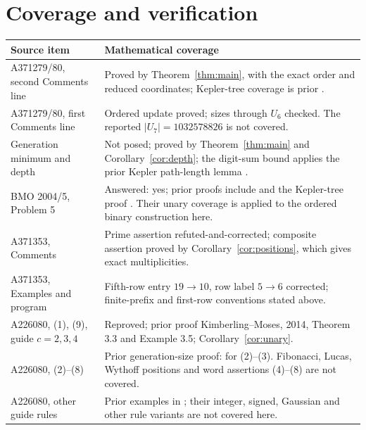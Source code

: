 \documentclass[11pt]{article}
\begin{document}
\section{Coverage and verification}
\begin{center}
\small
\begin{tabular}{@{}p{.25\linewidth}p{.67\linewidth}@{}}
\toprule
Source item & Mathematical coverage \\
\midrule
A371279/80, second Comments line & Proved by Theorem~\ref{thm:main},
with the exact order and reduced coordinates; Kepler-tree coverage is prior
\cite{smolinsky,dekking}. \\
A371279/80, first Comments line & Ordered update proved; sizes through
$U_6$ checked. The reported $|U_7|=1032578826$ is not covered. \\
Generation minimum and depth & Not posed; proved by Theorem~\ref{thm:main}
and Corollary~\ref{cor:depth}; the digit-sum bound applies the prior
Kepler path-length lemma \cite{minkowski}. \\
BMO 2004/5, Problem 5 & Answered: yes; prior proofs include
\cite[Solution 14]{saha} and the Kepler-tree proof \cite[Theorem 6.2]{recent}.
Their unary coverage is applied to the ordered binary construction here. \\
A371353, Comments & Prime assertion refuted-and-corrected; composite assertion
proved by Corollary~\ref{cor:positions}, which gives exact multiplicities. \\
A371353, Examples and program & Fifth-row entry $19\to10$, row label
$5\to6$ corrected; finite-prefix and first-row conventions stated above. \\
A226080, (1), (9), guide $c=2,3,4$ & Reproved; prior proof Kimberling--Moses,
2014, Theorem 3.3 and Example 3.5; Corollary~\ref{cor:unary}. \\
A226080, (2)--(8) & Prior generation-size proof: \cite[Theorem 3.2, $c=1$]{trees}
for (2)--(3). Fibonacci, Lucas, Wythoff positions and word assertions
(4)--(8) are not covered. \\
A226080, other guide rules & Prior examples in \cite[Sections 2--6]{trees};
their integer, signed, Gaussian and other rule variants are not covered here. \\
\bottomrule
\end{tabular}
\end{center}
\end{document}
